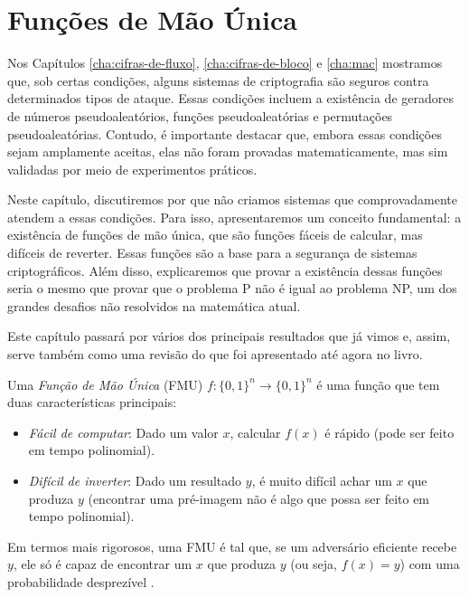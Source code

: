 \chapter{Funções de Mão Única}
\label{cha:owf}

Nos Capítulos \ref{cha:cifras-de-fluxo}, \ref{cha:cifras-de-bloco} e \ref{cha:mac} mostramos que, sob certas condições, alguns sistemas de criptografia são seguros contra determinados tipos de ataque.
Essas condições incluem a existência de geradores de números pseudoaleatórios, funções pseudoaleatórias e permutações pseudoaleatórias.
Contudo, é importante destacar que, embora essas condições sejam amplamente aceitas, elas não foram provadas matematicamente, mas sim validadas por meio de experimentos práticos.

Neste capítulo, discutiremos por que não criamos sistemas que comprovadamente atendem a essas condições.
Para isso, apresentaremos um conceito fundamental:
a existência de funções de mão única, que são funções fáceis de calcular, mas difíceis de reverter.
Essas funções são a base para a segurança de sistemas criptográficos.
Além disso, explicaremos que provar a existência dessas funções seria o mesmo que provar que o problema P não é igual ao problema NP, um dos grandes desafios não resolvidos na matemática atual.

Este capítulo passará por vários dos principais resultados que já vimos e, assim, serve também como uma revisão do que foi apresentado até agora no livro.

Uma {\em Função de Mão Única} (FMU) $f: \{0,1\}^n \to \{0,1\}^n$ é uma função que tem duas características principais:

\begin{itemize}
\item[] {\em Fácil de computar}:
  Dado um valor $x$, calcular $f(x)$ é rápido (pode ser feito em tempo polinomial).
\item[] {\em Difícil de inverter}: Dado um resultado $y$, é muito difícil achar um $x$ que produza $y$ (encontrar uma pré-imagem não é algo que possa ser feito em tempo polinomial).
\end{itemize}

Em termos mais rigorosos, uma FMU é tal que, se um adversário eficiente recebe $y$, ele só é capaz de encontrar um $x$ que produza $y$ (ou seja, $f(x) = y$) com uma probabilidade desprezível \cite{Diffie76,Yao82}.

